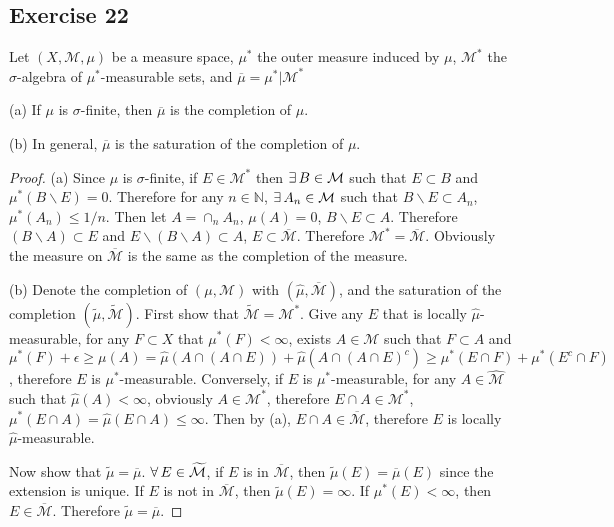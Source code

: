 \subsection*{Exercise 22}
Let $(X,\mathcal{M},\mu)$ be a measure space, $\mu^*$ the outer measure induced by $\mu$, $\mathcal{M}^*$ the $\sigma$-algebra of $\mu^*$-measurable sets, and $\overline{\mu}=\mu^*|\mathcal{M}^*$
\par (a) If $\mu$ is $\sigma$-finite, then $\overline{\mu}$ is the completion of $\mu$.
\par (b) In general, $\overline{\mu}$ is the saturation of the completion of $\mu$.
\begin{proof}
    (a) Since $\mu$ is $\sigma$-finite, if $E\in\mathcal{M}^*$ then $\exists\, B\in\mathcal{M}$ such that $E\subset B$ and $\mu^*(B\backslash E)=0$. Therefore for any $n\in\mathbb{N}$, $\exists\, A_n\in\mathcal{M}$ such that $B\backslash E\subset A_n$, $\mu^*(A_n)\le1/n$. Then let $A=\cap_n A_n$, $\mu(A)=0$, $B\backslash E\subset A$. Therefore $(B\backslash A)\subset E$ and $E\backslash(B\backslash A)\subset A$, $E\subset\overline{\mathcal{M}}$. Therefore $\mathcal{M}^*=\overline{\mathcal{M}}$. Obviously the measure on $\overline{\mathcal{M}}$ is the same as the completion of the measure.
    \par (b) Denote the completion of $(\mu,\mathcal{M})$ with $(\hat{\mu},\overline{\mathcal{M}})$, and the saturation of the completion $(\widetilde{\mu},\widetilde{\mathcal{M}})$. First show that $\widetilde{\mathcal{M}}=\mathcal{M}^*$. Give any $E$ that is locally $\hat{\mu}$-measurable, for any $F\subset X$ that $\mu^*(F)<\infty$, exists $A\in\mathcal{M}$ such that $F\subset A$ and $\mu^*(F)+\epsilon\ge\mu(A)=\hat\mu(A\cap(A\cap E))+\hat\mu(A\cap(A\cap E)^c)\ge\mu^*(E\cap F)+\mu^*(E^c\cap F)$, therefore $E$ is $\mu^*$-measurable. Conversely, if $E$ is $\mu^*$-measurable, for any $A\in\hat{\mathcal{M}}$ such that $\hat\mu(A)<\infty$, obviously $A\in\mathcal{M}^*$, therefore $E\cap A\in\mathcal{M}^*$, $\mu^*(E\cap A)=\hat\mu(E\cap A)\le\infty$. Then by (a), $E\cap A\in\overline{\mathcal{M}}$, therefore $E$ is locally $\hat\mu$-measurable.
    \par Now show that $\widetilde{\mu}=\overline{\mu}$. $\forall\, E\in\widetilde{\mathcal{M}}$, if $E$ is in $\overline{\mathcal{M}}$, then $\widetilde{\mu}(E)=\overline{\mu}(E)$ since the extension is unique. If $E$ is not in $\overline{\mathcal{M}}$, then $\widetilde{\mu}(E)=\infty$. If $\mu^*(E)<\infty$, then $E\in\overline{\mathcal{M}}$. Therefore $\widetilde{\mu}=\overline{\mu}$.
\end{proof}
